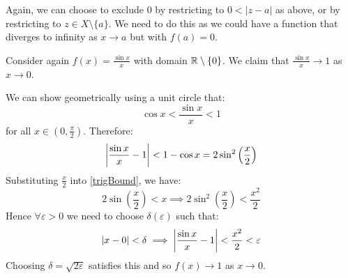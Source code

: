 \documentclass[../main.tex]{subfiles}
\begin{document}
\begin{remark}[Note]
  Again, we can choose to exclude $0$ by restricting to $0 < |z - a|$ as above, or by restricting to $z \in X \setminus \{a\}$.
  We need to do this as we could have a function that diverges to infinity as $x \to a$ but with $f(a) = 0$.
\end{remark}
\begin{example}
  \label{sinxExample}
  Consider again $f(x) = \frac{\sin x}{x}$ with domain $\mathbb{R} \setminus \{0\}$.
  We claim that $\frac{\sin x}{x} \to 1$ as $x \to 0$.

  We can show geometrically using a unit circle that:
  \begin{equation}
    \cos x < \frac{\sin x}{x} < 1 \label{trigBound}
  \end{equation}
  for all $x \in (0, \frac{\pi}{2})$.
  Therefore:
  \[
    \left\lvert \frac{\sin x}{x} - 1 \right\rvert < 1 - \cos x = 2 \sin^2 \left(\frac{x}{2}\right)
  \]
  Substituting $\frac{x}{2}$ into \cref{trigBound}, we have:
  \[
    2\sin\left(\frac{x}{2}\right) < x \implies 2\sin^2\left(\frac{x}{2}\right) < \frac{x^2}{2}
  \]
  Hence $\forall \varepsilon > 0$ we need to choose $\delta(\varepsilon)$ such that:
  \[
    |x - 0| < \delta \implies \left\lvert \frac{\sin x}{x} - 1 \right\rvert < \frac{x^2}{2} < \varepsilon
  \]
  Choosing $\delta = \sqrt{2\varepsilon}$ satisfies this and so $f(x) \to 1$ as $x \to 0$.
\end{example}
\end{document}
